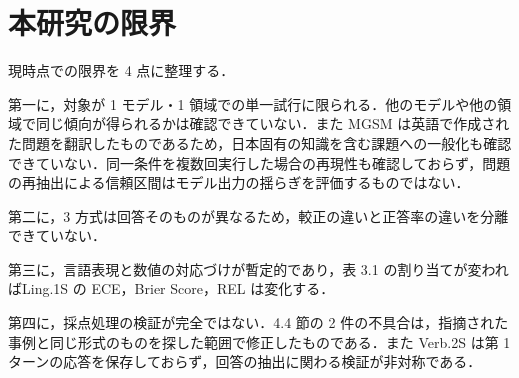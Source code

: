 \section{本研究の限界}

現時点での限界を 4 点に整理する．

第一に，対象が 1 モデル・1 領域での単一試行に限られる．他のモデルや他の領域で同じ傾向が得られるかは確認できていない．また MGSM は英語で作成された問題を翻訳したものであるため，日本固有の知識を含む課題への一般化も確認できていない．同一条件を複数回実行した場合の再現性も確認しておらず，問題の再抽出による信頼区間はモデル出力の揺らぎを評価するものではない．

第二に，3 方式は回答そのものが異なるため，較正の違いと正答率の違いを分離できていない．

第三に，言語表現と数値の対応づけが暫定的であり，表 3.1 の割り当てが変わればLing.1S の ECE，Brier Score，REL は変化する．

第四に，採点処理の検証が完全ではない．4.4 節の 2 件の不具合は，指摘された事例と同じ形式のものを探した範囲で修正したものである．また Verb.2S は第 1 ターンの応答を保存しておらず，回答の抽出に関わる検証が非対称である．
